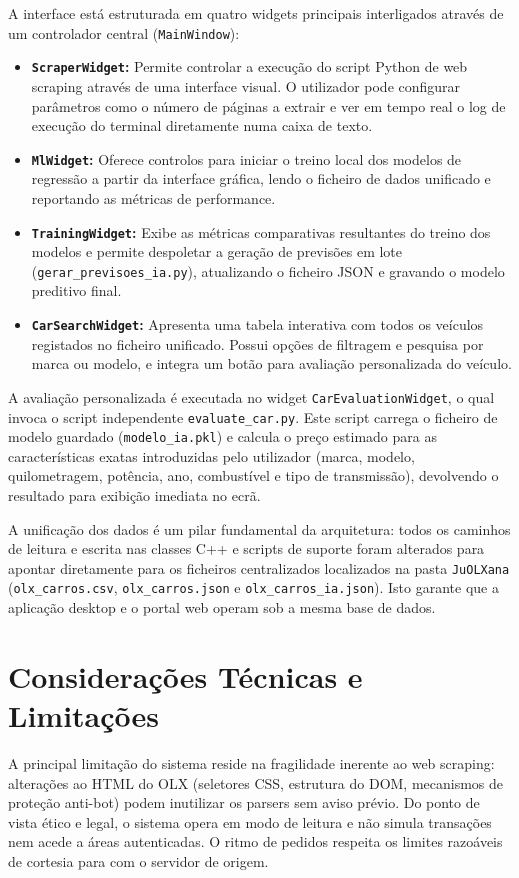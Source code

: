 \documentclass[11pt,a4paper]{article}
\begin{document}
A interface está estruturada em quatro widgets principais interligados através de um controlador central (\texttt{MainWindow}):
\begin{itemize}
    \item \textbf{\texttt{ScraperWidget}:} Permite controlar a execução do script Python de web scraping através de uma interface visual. O utilizador pode configurar parâmetros como o número de páginas a extrair e ver em tempo real o log de execução do terminal diretamente numa caixa de texto.
    \item \textbf{\texttt{MlWidget}:} Oferece controlos para iniciar o treino local dos modelos de regressão a partir da interface gráfica, lendo o ficheiro de dados unificado e reportando as métricas de performance.
    \item \textbf{\texttt{TrainingWidget}:} Exibe as métricas comparativas resultantes do treino dos modelos e permite despoletar a geração de previsões em lote (\texttt{gerar\_previsoes\_ia.py}), atualizando o ficheiro JSON e gravando o modelo preditivo final.
    \item \textbf{\texttt{CarSearchWidget}:} Apresenta uma tabela interativa com todos os veículos registados no ficheiro unificado. Possui opções de filtragem e pesquisa por marca ou modelo, e integra um botão para avaliação personalizada do veículo.
\end{itemize}

A avaliação personalizada é executada no widget \texttt{CarEvaluationWidget}, o qual invoca o script independente \texttt{evaluate\_car.py}. Este script carrega o ficheiro de modelo guardado (\texttt{modelo\_ia.pkl}) e calcula o preço estimado para as características exatas introduzidas pelo utilizador (marca, modelo, quilometragem, potência, ano, combustível e tipo de transmissão), devolvendo o resultado para exibição imediata no ecrã.

A unificação dos dados é um pilar fundamental da arquitetura: todos os caminhos de leitura e escrita nas classes C++ e scripts de suporte foram alterados para apontar diretamente para os ficheiros centralizados localizados na pasta \texttt{JuOLXana} (\texttt{olx\_carros.csv}, \texttt{olx\_carros.json} e \texttt{olx\_carros\_ia.json}). Isto garante que a aplicação desktop e o portal web operam sob a mesma base de dados.

\section{Considerações Técnicas e Limitações}
A principal limitação do sistema reside na fragilidade inerente ao web scraping: alterações ao HTML do OLX (seletores CSS, estrutura do DOM, mecanismos de proteção anti-bot) podem inutilizar os parsers sem aviso prévio. Do ponto de vista ético e legal, o sistema opera em modo de leitura e não simula transações nem acede a áreas autenticadas. O ritmo de pedidos respeita os limites razoáveis de cortesia para com o servidor de origem.
\end{document}
